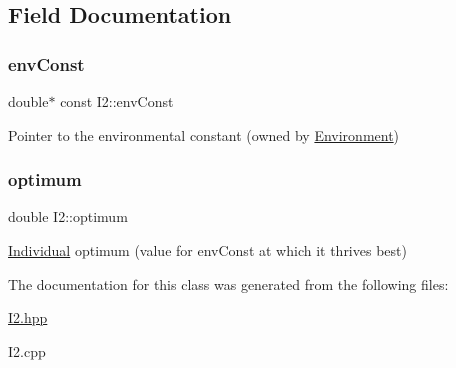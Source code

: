 \subsection{Field Documentation}
\mbox{\label{classI2_a16f94b60e5a6c02c67a46500798fd7cf}} 
\subsubsection{\texorpdfstring{env\+Const}{envConst}}
{\footnotesize\ttfamily double$\ast$ const I2\+::env\+Const}

Pointer to the environmental constant (owned by \hyperlink{classEnvironment}{Environment}) \mbox{\label{classI2_a5f022bb4d32b5ee96e117b72e17b262a}} 
\subsubsection{\texorpdfstring{optimum}{optimum}}
{\footnotesize\ttfamily double I2\+::optimum}

\hyperlink{classIndividual}{Individual} optimum (value for env\+Const at which it thrives best) 

The documentation for this class was generated from the following files\+:\begin{DoxyCompactItemize}
\item 
\hyperlink{I2_8hpp}{I2.\+hpp}\item 
I2.\+cpp\end{DoxyCompactItemize}
